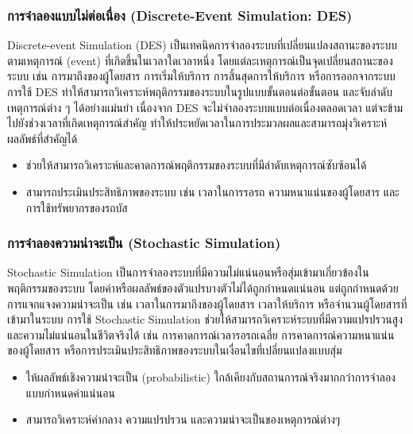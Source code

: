 \subsubsection{การจำลองแบบไม่ต่อเนื่อง (Discrete-Event Simulation: DES)}
\begin{mypara}
    \indent Discrete-event Simulation (DES) เป็นเทคนิคการจำลองระบบที่เปลี่ยนแปลงสถานะของระบบตามเหตุการณ์ (event) 
    ที่เกิดขึ้นในเวลาใดเวลาหนึ่ง โดยแต่ละเหตุการณ์เป็นจุดเปลี่ยนสถานะของระบบ 
    เช่น การมาถึงของผู้โดยสาร การเริ่มให้บริการ การสิ้นสุดการให้บริการ หรือการออกจากระบบ 
    การใช้ DES ทำให้สามารถวิเคราะห์พฤติกรรมของระบบในรูปแบบขั้นตอนต่อขั้นตอน 
    และจับลำดับเหตุการณ์ต่าง ๆ ได้อย่างแม่นยำ เนื่องจาก DES จะไม่จำลองระบบแบบต่อเนื่องตลอดเวลา 
    แต่จะข้ามไปยังช่วงเวลาที่เกิดเหตุการณ์สำคัญ ทำให้ประหยัดเวลาในการประมวลผลและสามารถมุ่งวิเคราะห์ผลลัพธ์ที่สำคัญได้
\end{mypara}
\begin{itemize}
  \item ช่วยให้สามารถวิเคราะห์และคาดการณ์พฤติกรรมของระบบที่มีลำดับเหตุการณ์ซับซ้อนได้
  \item สามารถประเมินประสิทธิภาพของระบบ เช่น เวลาในการรอรถ ความหนาแน่นของผู้โดยสาร และการใช้ทรัพยากรของรถบัส
\end{itemize}
\subsubsection{การจำลองความน่าจะเป็น (Stochastic Simulation)}
\begin{mypara}
    \indent Stochastic Simulation เป็นการจำลองระบบที่มีความไม่แน่นอนหรือสุ่มเข้ามาเกี่ยวข้องในพฤติกรรมของระบบ
    โดยค่าหรือผลลัพธ์ของตัวแปรบางตัวไม่ได้ถูกกำหนดแน่นอน 
    แต่ถูกกำหนดด้วยการแจกแจงความน่าจะเป็น เช่น เวลาในการมาถึงของผู้โดยสาร เวลาให้บริการ 
    หรือจำนวนผู้โดยสารที่เข้ามาในระบบ การใช้ Stochastic Simulation 
    ช่วยให้สามารถวิเคราะห์ระบบที่มีความแปรปรวนสูงและความไม่แน่นอนในชีวิตจริงได้ 
    เช่น การคาดการณ์เวลารอรถเฉลี่ย การคาดการณ์ความหนาแน่นของผู้โดยสาร 
    หรือการประเมินประสิทธิภาพของระบบในเงื่อนไขที่เปลี่ยนแปลงแบบสุ่ม
\end{mypara}
\begin{itemize}
  \item ให้ผลลัพธ์เชิงความน่าจะเป็น (probabilistic) ใกล้เคียงกับสถานการณ์จริงมากกว่าการจำลองแบบกำหนดค่าแน่นอน
  \item สามารถวิเคราะห์ค่ากลาง ความแปรปรวน และความน่าจะเป็นของเหตุการณ์ต่างๆ
\end{itemize}

